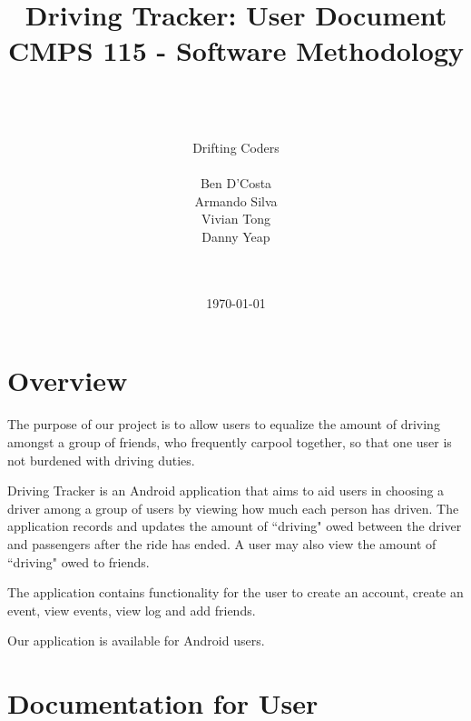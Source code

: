 \documentclass[12pt]{article}
\title{Driving Tracker: User Document \\ CMPS 115 - Software Methodology}
\author{\\ \\ \\ Drifting Coders \\ \\ Ben D'Costa \\ Armando Silva \\ Vivian Tong \\ Danny Yeap \\ \\ \\}
\date{\today}
\begin{document}
\maketitle
\newpage

\tableofcontents
\newpage

\section{Overview}

The purpose of our project is to allow users to equalize the amount of driving amongst a group of friends, who frequently carpool together, so that one user is not burdened with driving duties. 

Driving Tracker is an Android application that aims to aid users in choosing a driver among a group of users by viewing how much each person has driven. The application records and updates the amount of ``driving" owed between the driver and passengers after the ride has ended. A user may also view the amount of ``driving" owed to friends.  

The application contains functionality for the user to create an account, create an event, view events, view log and add friends.

Our application is available for Android users.

\section{Documentation for User}
\end{document}
